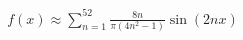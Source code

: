 \documentclass[preview]{standalone}
\begin{document}
\begin{align*}
f(x) \approx \sum_{n=1}^{52} \frac{8n}{\pi(4n^2-1)} \sin(2nx)
\end{align*}
\end{document}
